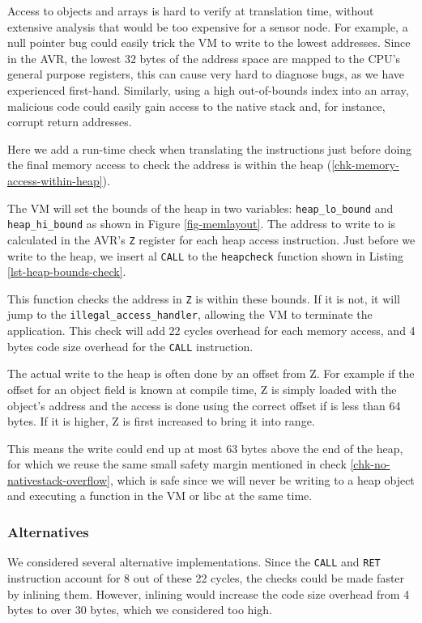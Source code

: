 Access to objects and arrays is hard to verify at translation time, without extensive analysis that would be too expensive for a sensor node. For example, a null pointer bug could easily trick the VM to write to the lowest addresses. Since in the AVR, the lowest 32 bytes of the address space are mapped to the CPU's general purpose registers, this can cause very hard to diagnose bugs, as we have experienced first-hand. Similarly, using a high out-of-bounds index into an array, malicious code could easily gain access to the native stack and, for instance, corrupt return addresses.

Here we add a run-time check when translating the instructions just before doing the final memory access to check the address is within the heap (\ref{chk-memory-access-within-heap}).

The VM will set the bounds of the heap in two variables: \texttt{heap\_lo\_bound} and \texttt{heap\_hi\_bound} as shown in Figure \ref{fig-memlayout}. The address to write to is calculated in the AVR's \texttt{Z} register for each heap access instruction. Just before we write to the heap, we insert al \texttt{CALL} to the \texttt{heapcheck} function shown in Listing \ref{lst-heap-bounds-check}.

This function checks the address in \texttt{Z} is within these bounds. If it is not, it will jump to the \texttt{illegal\_access\_handler}, allowing the VM to terminate the application. This check will add 22 cycles overhead for each memory access, and 4 bytes code size overhead for the \texttt{CALL} instruction.

The actual write to the heap is often done by an offset from Z. For example if the offset for an object field is known at compile time, Z is simply loaded with the object's address and the access is done using the correct offset if is less than 64 bytes. If it is higher, Z is first increased to bring it into range.

This means the write could end up at most 63 bytes above the end of the heap, for which we reuse the same small safety margin mentioned in check \ref{chk-no-nativestack-overflow}, which is safe since we will never be writing to a heap object and executing a function in the VM or libc at the same time.

\subsubsection{Alternatives}
We considered several alternative implementations. Since the \texttt{CALL} and \texttt{RET} instruction account for 8 out of these 22 cycles, the checks could be made faster by inlining them. However, inlining would increase the code size overhead from 4 bytes to over 30 bytes, which we considered too high.

